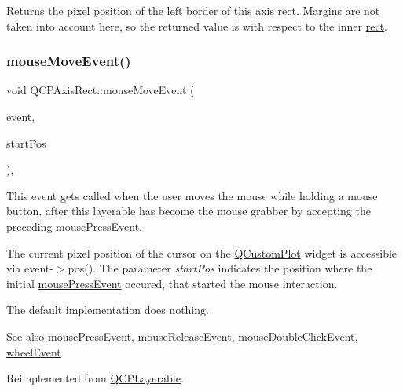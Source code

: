 Returns the pixel position of the left border of this axis rect. Margins are not taken into account here, so the returned value is with respect to the inner \hyperlink{classQCPLayoutElement_a208effccfe2cca4a0eaf9393e60f2dd4}{rect}. \mbox{\label{classQCPAxisRect_a9cd27ad8c5cfb49aefd9dbb30def4beb}} 
\subsubsection{\texorpdfstring{mouse\+Move\+Event()}{mouseMoveEvent()}}
{\footnotesize\ttfamily void Q\+C\+P\+Axis\+Rect\+::mouse\+Move\+Event (\begin{DoxyParamCaption}\item[{Q\+Mouse\+Event $\ast$}]{event,  }\item[{const Q\+PointF \&}]{start\+Pos }\end{DoxyParamCaption})\hspace{0.3cm}{\ttfamily [protected]}, {\ttfamily [virtual]}}

This event gets called when the user moves the mouse while holding a mouse button, after this layerable has become the mouse grabber by accepting the preceding \hyperlink{classQCPAxisRect_aa9a7c807eaa4666870ac94aa6abc4dde}{mouse\+Press\+Event}.

The current pixel position of the cursor on the \hyperlink{classQCustomPlot}{Q\+Custom\+Plot} widget is accessible via {\ttfamily event-\/$>$pos()}. The parameter {\itshape start\+Pos} indicates the position where the initial \hyperlink{classQCPAxisRect_aa9a7c807eaa4666870ac94aa6abc4dde}{mouse\+Press\+Event} occured, that started the mouse interaction.

The default implementation does nothing.

\begin{DoxySeeAlso}{See also}
\hyperlink{classQCPAxisRect_aa9a7c807eaa4666870ac94aa6abc4dde}{mouse\+Press\+Event}, \hyperlink{classQCPAxisRect_a6c89b988d3a0b93c0878f0ebdb5037f4}{mouse\+Release\+Event}, \hyperlink{classQCPLayerable_a4171e2e823aca242dd0279f00ed2de81}{mouse\+Double\+Click\+Event}, \hyperlink{classQCPAxisRect_a93eeaa0c127d6d6fe8171b2455080262}{wheel\+Event} 
\end{DoxySeeAlso}


Reimplemented from \hyperlink{classQCPLayerable_a9eee1ba47fd69be111059ca3881933e4}{Q\+C\+P\+Layerable}.

